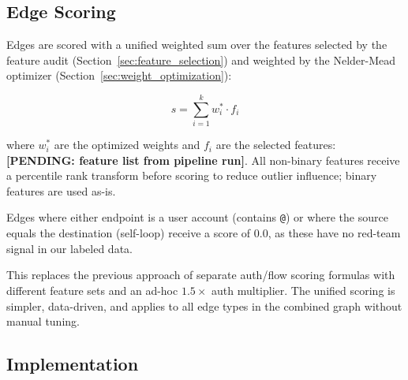 

\subsection{Edge Scoring}
\label{sec:edge_scoring}

Edges are scored with a unified weighted sum over the features selected by the feature audit (Section~\ref{sec:feature_selection}) and weighted by the Nelder-Mead optimizer (Section~\ref{sec:weight_optimization}):

\begin{equation}
s = \sum_{i=1}^{k} w_i^* \cdot f_i
\end{equation}

where $w_i^*$ are the optimized weights and $f_i$ are the selected features: \textbf{[PENDING: feature list from pipeline run]}. All non-binary features receive a percentile rank transform before scoring to reduce outlier influence; binary features are used as-is.

Edges where either endpoint is a user account (contains \texttt{@}) or where the source equals the destination (self-loop) receive a score of 0.0, as these have no red-team signal in our labeled data.

This replaces the previous approach of separate auth/flow scoring formulas with different feature sets and an ad-hoc $1.5\times$ auth multiplier. The unified scoring is simpler, data-driven, and applies to all edge types in the combined graph without manual tuning.


\subsection{Implementation}

